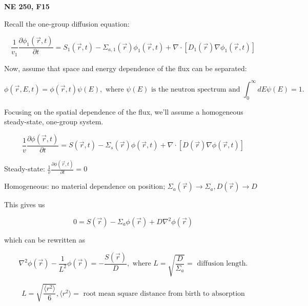 \documentclass[12pt]{article}
\newcommand{\rvec}{\ensuremath{\vec{r}}}
\newcommand{\vecr}{\ensuremath{\vec{r}}}
\begin{document}
\begin{center}
{\bf NE 250, F15 
}
\end{center}


Recall the one-group diffusion equation:

\begin{equation*}
\frac{1}{v_1}\frac{\partial \phi_1(\rvec,t)}{\partial t} = S_1(\rvec,t) - 
\Sigma_{a,1}(\rvec)\phi_1(\rvec,t) + \nabla\cdot[D_1(\rvec)\nabla\phi_1(\rvec,t)]
\end{equation*}

Now, assume that space and energy dependence of the flux can be separated:

\begin{equation*}
\phi(\vecr,E,t) = \phi(\vecr,t)\psi(E), 
\text{ where $\psi(E)$ is the neutron spectrum and $\int_0^{\infty}dE\psi(E) = 1$.}
\end{equation*}

Focusing on the spatial dependence of the flux, we'll assume a homogeneous steady-state, one-group system.

\begin{equation*}
\frac{1}{v}\frac{\partial\phi(\rvec,t)}{\partial t} = S(\rvec,t) - \Sigma_s(\rvec)\phi(\rvec,t)
+ \nabla\cdot[D(\rvec)\nabla\phi(\rvec,t)]
\end{equation*}

Steady-state: $\frac{1}{v}\frac{\partial\phi(\rvec,t)}{\partial t} = 0$


Homogeneous: no material dependence on position; 
$\Sigma_a(\rvec)\rightarrow\Sigma_a, D(\rvec)\rightarrow D$


This gives us

\begin{equation*}
0 = S(\vecr) - \Sigma_a\phi(\vecr) + D\nabla^2\phi(\vecr)
\end{equation*}

which can be rewritten as

\begin{equation*}
\nabla^2\phi(\vecr) - \frac{1}{L^2}\phi(\rvec) = -\frac{S(\rvec)}{D},
\text{ where $L = \sqrt{\frac{D}{\Sigma_a}} =$ diffusion length.}
\end{equation*}

\begin{equation*}
L = \sqrt{\frac{\langle r^2\rangle}{6}}, \langle r^2\rangle 
=\text{ root mean square distance from birth to absorption}
\end{equation*}
\end{document}
